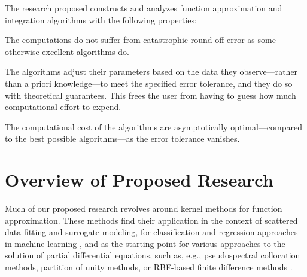 \documentclass[11pt]{NSFamsart}
\begin{document}
The research proposed constructs and analyzes function approximation and integration algorithms with the following properties:
\begin{description}[leftmargin=2.5ex]
\item[Stability] The computations do not suffer from catastrophic round-off error as some otherwise excellent algorithms do.

\item[Adaptivity] The algorithms adjust their parameters based on the data they observe---rather than a priori knowledge---to meet the specified error tolerance, and they do so with theoretical guarantees.  This frees the user from having to guess how much computational effort to expend.

\item[Efficiency] The computational cost of the algorithms are asymptotically optimal---compared to the best possible algorithms---as the error tolerance vanishes.
\end{description}


\section{Overview of Proposed Research}
Much of our proposed research revolves around kernel methods for function approximation\citep{Fas07a,SchWen06a,Wen05a}. These methods find their application in the context of scattered data fitting and surrogate modeling, for classification and regression approaches in machine learning \citep{HasTibFrie01}, and as the starting point for various approaches to the solution of partial differential equations, such as, e.g., pseudospectral collocation methods, partition of unity methods, or RBF-based finite difference methods \citep{Fas07a,FornbergFlyer15}.
\end{document}
